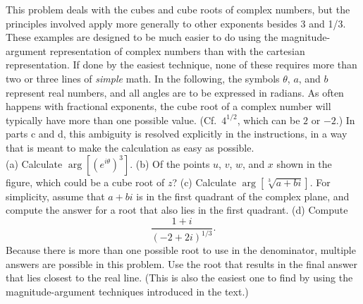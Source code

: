 This problem deals with the cubes and cube roots of complex numbers, but the principles
involved apply more generally to other exponents besides 3 and 1/3. These examples
are designed to be much easier to do using the magnitude-argument representation
of complex numbers than with the cartesian representation. If done by the easiest technique,
none of these requires more than two or three lines of \emph{simple} math.
In the following, the
symbols $\theta$, $a$, and $b$ represent real numbers, and all angles are to be expressed in radians.
As often happens with fractional exponents, the cube root of a complex number will typically have
more than one possible value. (Cf.~$4^{1/2}$, which can be $2$ or $-2$.) In parts c and d,
this ambiguity is resolved explicitly in the instructions, in a way that is meant to make
the calculation as easy as possible.\\
(a) Calculate $\arg\left[(e^{i\theta})^3\right]$.\answercheck\hwendpart
(b) Of the points $u$, $v$, $w$, and $x$ shown in the figure, which could be
a cube root of $z$?\hwendpart
(c) Calculate $\arg\left[\sqrt[3]{a+bi}\right]$. For simplicity, assume that
$a+bi$ is in the first quadrant of the complex plane, and compute the answer
for a root that also lies in the first quadrant.\answercheck\hwendpart
(d) Compute
\begin{equation*}
  \frac{1+i}{(-2+2i)^{1/3}}.
\end{equation*}
Because there is more than one possible root to use in the denominator, multiple
answers are possible in this problem. Use the root that results in the final answer
that lies closest to the real line. (This is
also the easiest one to find by using the magnitude-argument techniques
introduced in the text.)\answercheck

